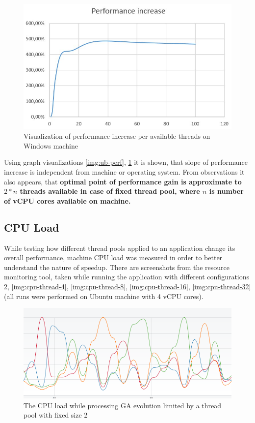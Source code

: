 \begin{figure}[h]
\centering\includegraphics[width=.8\textwidth]{img/exp/2/windows-performance-increase}
\caption{Visualization of performance increase per available threads on Windows machine}  \label{img:win-perf}
\end{figure}

Using graph visualizations \ref{img:ub-perf}, \ref{img:win-perf} it is shown, that slope of performance increase is independent from machine or operating system. From observations it also appears, that \textbf{optimal point of performance gain is approximate to \( 2 * n\) threads available in case of fixed thread pool, where \(n\) is number of vCPU cores available on machine.}

\subsection{CPU Load}

While testing how different thread pools applied to an application change its overall performance, machine CPU load was measured in order to better understand the nature of speedup. There are screenshots from the resource monitoring tool, taken while running the application with different configurations \ref{img:cpu-thread-2}, \ref{img:cpu-thread-4}, \ref{img:cpu-thread-8}, \ref{img:cpu-thread-16}, \ref{img:cpu-thread-32} (all runs were performed on Ubuntu machine with 4 vCPU cores).

\begin{figure}[h]
\centering\includegraphics[width=.8\textwidth]{img/exp/2/limit-threadpool-2}
\caption{The CPU load while processing GA evolution limited by a thread pool with fixed size 2 }  \label{img:cpu-thread-2}
\end{figure}
\smallskip

